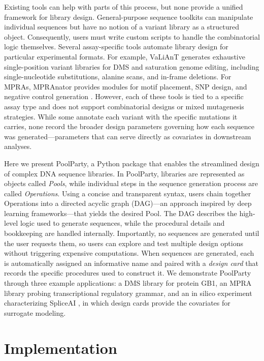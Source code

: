 \documentclass[pdflatex,sn-vancouver-num,referee,oneside]{sn-jnl}
\begin{document}
Existing tools can help with parts of this process, but none provide a unified framework for library design. General-purpose sequence toolkits \citep{Cock2009df, Pereira2015wj, Klie2023kg, Schreiber2025nd} can manipulate individual sequences but have no notion of a variant library as a structured object. Consequently, users must write custom scripts to handle the combinatorial logic themselves. Several assay-specific tools automate library design for particular experimental formats. For example, VaLiAnT \citep{Barbon2022th} generates exhaustive single-position variant libraries for DMS and saturation genome editing, including single-nucleotide substitutions, alanine scans, and in-frame deletions. For MPRAs, MPRAnator \citep{GeorgakopoulosSoares2017gb} provides modules for motif placement, SNP design, and negative control generation \citep[see also][]{Ghazi2018aa}. However, each of these tools is tied to a specific assay type and does not support combinatorial designs or mixed mutagenesis strategies. While some annotate each variant with the specific mutations it carries, none record the broader design parameters governing how each sequence was generated---parameters that can serve directly as covariates in downstream analyses.

Here we present PoolParty, a Python package that enables the streamlined design of complex DNA sequence libraries. In PoolParty, libraries are represented as objects called \emph{Pools}, while individual steps in the sequence generation process are called \emph{Operations}. Using a concise and transparent syntax, users chain together Operations into a directed acyclic graph (DAG)---an approach inspired by deep learning frameworks---that yields the desired Pool. The DAG describes the high-level logic used to generate sequences, while the procedural details and bookkeeping are handled internally. Importantly, no sequences are generated until the user requests them, so users can explore and test multiple design options without triggering expensive computations. When sequences are generated, each is automatically assigned an informative name and paired with a \emph{design card} that records the specific procedures used to construct it. We demonstrate PoolParty through three example applications: a DMS library for protein GB1, an MPRA library probing transcriptional regulatory grammar, and an in silico experiment characterizing SpliceAI \citep{Jaganathan2019ps}, in which design cards provide the covariates for surrogate modeling.

\section{Implementation}\label{sec:implementation}
\end{document}
